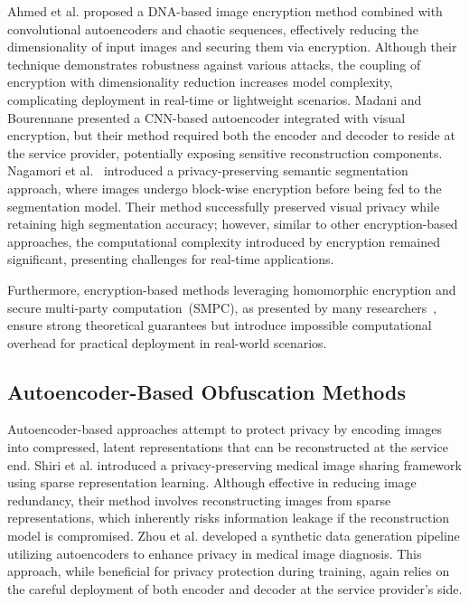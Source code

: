 \documentclass{ieeeaccess}
\begin{document}
Ahmed et al.\cite{10.1145/3570165} proposed a DNA-based image encryption method combined with convolutional autoencoders and chaotic sequences, effectively reducing the dimensionality of input images and securing them via encryption. Although their technique demonstrates robustness against various attacks, the coupling of encryption with dimensionality reduction increases model complexity, complicating deployment in real-time or lightweight scenarios. Madani and Bourennane\cite{Madani_2025} presented a CNN-based autoencoder integrated with visual encryption, but their method required both the encoder and decoder to reside at the service provider, potentially exposing sensitive reconstruction components. Nagamori et al.~\cite{jimaging8090233} introduced a privacy-preserving semantic segmentation approach, where images undergo block-wise encryption before being fed to the segmentation model. Their method successfully preserved visual privacy while retaining high segmentation accuracy; however, similar to other encryption-based approaches, the computational complexity introduced by encryption remained significant, presenting challenges for real-time applications. 

Furthermore, encryption-based methods leveraging homomorphic encryption and secure multi-party computation~(SMPC), as presented by many researchers~\cite{9936637,9833432,Jia2023,refId0,10.1145/3676641.3716008,garimella2025helrmencrypteddeeplearning,dhyani2023privitvisiontransformersfast,luo-etal-2024-secformer}, ensure strong theoretical guarantees but introduce impossible computational overhead for practical deployment in real-world scenarios.

\subsection{Autoencoder-Based Obfuscation Methods}

Autoencoder-based approaches attempt to protect privacy by encoding images into compressed, latent representations that can be reconstructed at the service end. Shiri et al.\cite{SHIRI2024104583} introduced a privacy-preserving medical image sharing framework using sparse representation learning. Although effective in reducing image redundancy, their method involves reconstructing images from sparse representations, which inherently risks information leakage if the reconstruction model is compromised. Zhou et al.\cite{Zhou2024} developed a synthetic data generation pipeline utilizing autoencoders to enhance privacy in medical image diagnosis. This approach, while beneficial for privacy protection during training, again relies on the careful deployment of both encoder and decoder at the service provider’s side.
\end{document}
